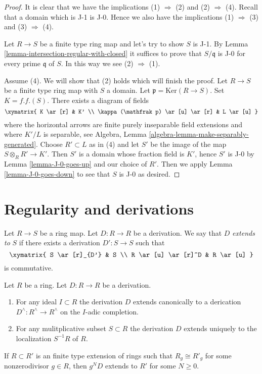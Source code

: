 \begin{proof}
It is clear that we have the implications (1) $\Rightarrow$ (2) and
(2) $\Rightarrow$ (4). Recall that a domain which is
J-1 is J-0. Hence we also have the implications
(1) $\Rightarrow$ (3) and (3) $\Rightarrow$ (4).

\medskip\noindent
Let $R \to S$ be a finite type ring map and let's try to show $S$ is J-1. By
Lemma \ref{lemma-intersection-regular-with-closed} it suffices
to prove that $S/\mathfrak q$ is J-0 for every prime $\mathfrak q$
of $S$. In this way we see (2) $\Rightarrow$ (1).

\medskip\noindent
Assume (4). We will show that (2) holds which will finish the proof.
Let $R \to S$ be a finite type ring map with $S$ a domain.
Let $\mathfrak p = \text{Ker}(R \to S)$. Set $K = f.f.(S)$. There exists
a diagram of fields
$$
\xymatrix{
K \ar[r] & K' \\
\kappa(\mathfrak p) \ar[u] \ar[r] & L \ar[u]
}
$$
where the horizontal arrows are finite purely inseparable field extensions
and where $K'/L$ is separable, see
Algebra, Lemma \ref{algebra-lemma-make-separably-generated}.
Choose $R' \subset L$ as in (4) and let
$S'$ be the image of the map $S \otimes_R R' \to K'$.
Then $S'$ is a domain whose fraction field is $K'$, hence
$S'$ is J-0 by Lemma \ref{lemma-J-0-goes-up} and our choice of $R'$.
Then we apply Lemma \ref{lemma-J-0-goes-down} to see that $S$
is J-0 as desired.
\end{proof}



\section{Regularity and derivations}
\label{section-regularity-derivations}

\noindent
Let $R \to S$ be a ring map. Let $D : R \to R$ be a derivation.
We say that $D$ {\it extends to} $S$
if there exists a derivation $D' : S \to S$ such that
$$
\xymatrix{
S \ar[r]_{D'} & S \\
R \ar[u] \ar[r]^D & R \ar[u]
}
$$
is commutative.

\begin{lemma}
\label{lemma-derivation-extends}
Let $R$ be a ring. Let $D : R \to R$ be a derivation.
\begin{enumerate}
\item For any ideal $I \subset R$ the derivation $D$ extends
canonically to a derication $D^\wedge : R^\wedge \to R^\wedge$
on the $I$-adic completion.
\item For any mulitplicative subset $S \subset R$ the derivation
$D$ extends uniquely to the localization $S^{-1}R$ of $R$.
\end{enumerate}
If $R \subset R'$ is an finite type extension of rings such that
$R_g \cong R'_g$ for some nonzerodivisor $g \in R$, then $g^ND$ extends
to $R'$ for some $N \geq 0$.
\end{lemma}

